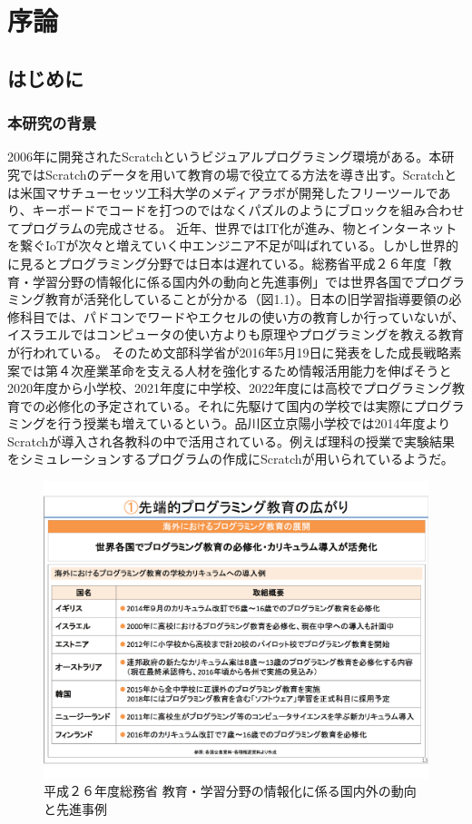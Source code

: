\documentclass[a4paper,10pt,onecolumn,oneside,openany]{jsbook}
\begin{document}
\part{序論} %
\chapter{はじめに}
\section{本研究の背景}

2006年に開発されたScratchというビジュアルプログラミング環境がある。本研究ではScratchのデータを用いて教育の場で役立てる方法を導き出す。Scratchとは米国マサチューセッツ工科大学のメディアラボが開発したフリーツールであり、キーボードでコードを打つのではなくパズルのようにブロックを組み合わせてプログラムの完成させる。
近年、世界ではIT化が進み、物とインターネットを繋ぐIoTが次々と増えていく中エンジニア不足が叫ばれている。しかし世界的に見るとプログラミング分野では日本は遅れている。総務省平成２６年度「教育・学習分野の情報化に係る国内外の動向と先進事例」では世界各国でプログラミング教育が活発化していることが分かる（図1.1）。日本の旧学習指導要領の必修科目では、パドコンでワードやエクセルの使い方の教育しか行っていないが、イスラエルではコンピュータの使い方よりも原理やプログラミングを教える教育が行われている。
そのため文部科学省が2016年5月19日に発表をした成長戦略素案では第４次産業革命を支える人材を強化するため情報活用能力を伸ばそうと2020年度から小学校、2021年度に中学校、2022年度には高校でプログラミング教育での必修化の予定されている。それに先駆けて国内の学校では実際にプログラミングを行う授業も増えているという。品川区立京陽小学校では2014年度よりScratchが導入され各教科の中で活用されている。例えば理科の授業で実験結果をシミュレーションするプログラムの作成にScratchが用いられているようだ。
\begin{figure}[h]
  \centering
    \includegraphics[scale=0.4]{graphic/foreign_data.pdf}
  \caption{平成２６年度総務省 教育・学習分野の情報化に係る国内外の動向と先進事例}
 \end{figure}
 
\end{document}
